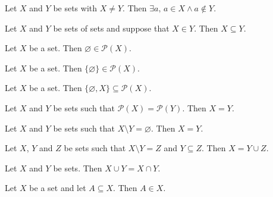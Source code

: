 \begin{chapex} %
Let $X$ and $Y$ be sets with $X \ne Y$. Then $\exists a,\, a \in X \wedge a \not\in Y$.
\end{chapex}

\begin{chapex} %
Let $X$ and $Y$ be sets of sets and suppose that $X \in Y$. Then $X \subseteq Y$.
\end{chapex}

\begin{chapex} %
Let $X$ be a set. Then $\varnothing \in \mathcal{P}(X)$.
\end{chapex}

\begin{chapex} %
Let $X$ be a set. Then $\{ \varnothing \} \in \mathcal{P}(X)$.
\end{chapex}

\begin{chapex} %
Let $X$ be a set. Then $\{ \varnothing, X \} \subseteq \mathcal{P}(X)$.
\end{chapex}

\begin{chapex} %
Let $X$ and $Y$ be sets such that $\mathcal{P}(X) = \mathcal{P}(Y)$. Then $X = Y$.
\end{chapex}

\begin{chapex} %
Let $X$ and $Y$ be sets such that $X \setminus Y = \varnothing$. Then $X = Y$.
\end{chapex}

\begin{chapex} %
Let $X$, $Y$ and $Z$ be sets such that $X \setminus Y = Z$ and $Y \subseteq Z$. Then $X = Y \cup Z$.
\end{chapex}

\begin{chapex} %
Let $X$ and $Y$ be sets. Then $X \cup Y = X \cap Y$.
\end{chapex}

\begin{chapex} %
Let $X$ be a set and let $A \subseteq X$. Then $A \in X$.
\end{chapex}

\begin{chapex}
\label{cqSetsASNEnd}

\end{chapex}